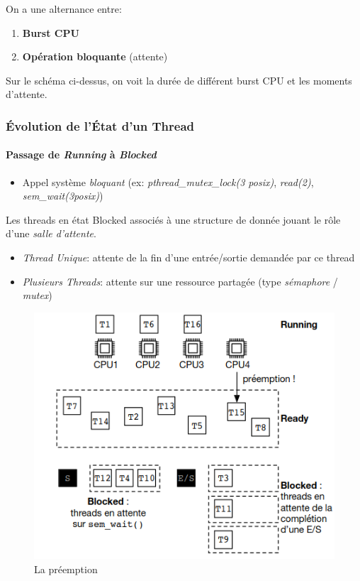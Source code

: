 On a une alternance entre:

\begin{enumerate}
\def\labelenumi{\arabic{enumi}.}
\tightlist
\item
  \textbf{Burst CPU}
\item
  \textbf{Opération bloquante} (attente)
\end{enumerate}

Sur le schéma ci-dessus, on voit la durée de différent burst CPU et les
moments d'attente.

\subsubsection{Évolution de l'État d'un
Thread}\label{uxe9volution-de-luxe9tat-dun-thread}

\paragraph{\texorpdfstring{Passage de \emph{Running} à
\emph{Blocked}}{Passage de Running à Blocked}}\label{passage-de-running-uxe0-blocked}

\begin{itemize}
\tightlist
\item
  Appel système \emph{bloquant} (ex: \emph{pthread\_mutex\_lock(3
  posix)}, \emph{read(2)}, \emph{sem\_wait(3posix)})
\end{itemize}

Les threads en état Blocked associés à une structure de donnée jouant le
rôle d'une \emph{salle d'attente}.

\begin{itemize}
\tightlist
\item
  \emph{Thread Unique}: attente de la fin d'une entrée/sortie demandée
  par ce thread
\item
  \emph{Plusieurs Threads}: attente sur une ressource partagée (type
  \emph{sémaphore} / \emph{mutex})
\end{itemize}

\begin{figure}
\centering
\includegraphics{image-30.png}
\caption{La préemption}
\end{figure}

